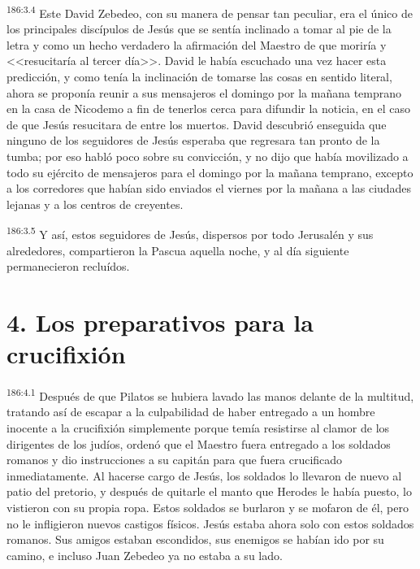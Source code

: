 \par 
\textsuperscript{186:3.4} Este David Zebedeo, con su manera de pensar tan peculiar, era el único de los principales discípulos de Jesús que se sentía inclinado a tomar al pie de la letra y como un hecho verdadero la afirmación del Maestro de que moriría y <<resucitaría al tercer día>>. David le había escuchado una vez hacer esta predicción, y como tenía la inclinación de tomarse las cosas en sentido literal, ahora se proponía reunir a sus mensajeros el domingo por la mañana temprano en la casa de Nicodemo a fin de tenerlos cerca para difundir la noticia, en el caso de que Jesús resucitara de entre los muertos. David descubrió enseguida que ninguno de los seguidores de Jesús esperaba que regresara tan pronto de la tumba; por eso habló poco sobre su convicción, y no dijo que había movilizado a todo su ejército de mensajeros para el domingo por la mañana temprano, excepto a los corredores que habían sido enviados el viernes por la mañana a las ciudades lejanas y a los centros de creyentes.

\par 
\textsuperscript{186:3.5} Y así, estos seguidores de Jesús, dispersos por todo Jerusalén y sus alrededores, compartieron la Pascua aquella noche, y al día siguiente permanecieron recluídos.

\section*{4. Los preparativos para la crucifixión}
\par 
\textsuperscript{186:4.1} Después de que Pilatos se hubiera lavado las manos delante de la multitud, tratando así de escapar a la culpabilidad de haber entregado a un hombre inocente a la crucifixión simplemente porque temía resistirse al clamor de los dirigentes de los judíos, ordenó que el Maestro fuera entregado a los soldados romanos y dio instrucciones a su capitán para que fuera crucificado inmediatamente. Al hacerse cargo de Jesús, los soldados lo llevaron de nuevo al patio del pretorio, y después de quitarle el manto que Herodes le había puesto, lo vistieron con su propia ropa. Estos soldados se burlaron y se mofaron de él, pero no le infligieron nuevos castigos físicos. Jesús estaba ahora solo con estos soldados romanos. Sus amigos estaban escondidos, sus enemigos se habían ido por su camino, e incluso Juan Zebedeo ya no estaba a su lado.

